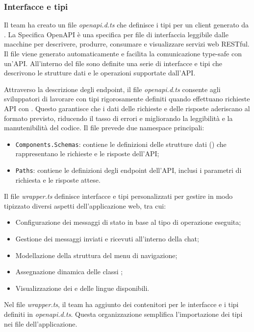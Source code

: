 \subsubsection{Interfacce e tipi} \label{InterfacceTipi}

 \label{OpenAPI}

\par Il team ha creato un file \textit{openapi.d.ts} che definisce i tipi  per un client generato da . La Specifica OpenAPI è una specifica per file di interfaccia leggibile dalle macchine per descrivere, produrre, consumare e visualizzare servizi web RESTful. Il file viene generato automaticamente e facilita la comunicazione type-safe con un'API. All'interno del file sono definite una serie di interfacce e tipi che descrivono le strutture dati e le operazioni supportate dall'API.

\par Attraverso la descrizione degli endpoint, il file \textit{openapi.d.ts} consente agli sviluppatori  di lavorare con tipi rigorosamente definiti quando effettuano richieste API con . Questo garantisce che i dati delle richieste e delle risposte aderiscano al formato previsto, riducendo il tasso di errori e migliorando la leggibilità e la manutenibilità del codice. Il file prevede due namespace principali:
\begin{itemize}
  \item \texttt{Components.Schemas}: contiene le definizioni delle strutture dati () che rappresentano le richieste e le risposte dell'API;
  \item \texttt{Paths}: contiene le definizioni degli endpoint dell'API, inclusi i parametri di richiesta e le risposte attese.
\end{itemize}

 \label{OpenAPI}

\par Il file \textit{wrapper.ts} definisce interfacce e tipi personalizzati per gestire in modo tipizzato diversi aspetti dell'applicazione web, tra cui:
\begin{itemize}
  \item Configurazione dei messaggi di stato in base al tipo di operazione eseguita;
  \item Gestione dei messaggi inviati e ricevuti all'interno della chat;
  \item Modellazione della struttura del menu di navigazione;
  \item Assegnazione dinamica delle classi ;
  \item Visualizzazione dei  e delle lingue disponibili.
\end{itemize}

\vspace{0.5\baselineskip}
\par Nel file \textit{wrapper.ts}, il team ha aggiunto dei contenitori per le interfacce e i tipi definiti in \textit{openapi.d.ts}. Questa organizzazione semplifica l'importazione dei tipi nei file dell'applicazione.